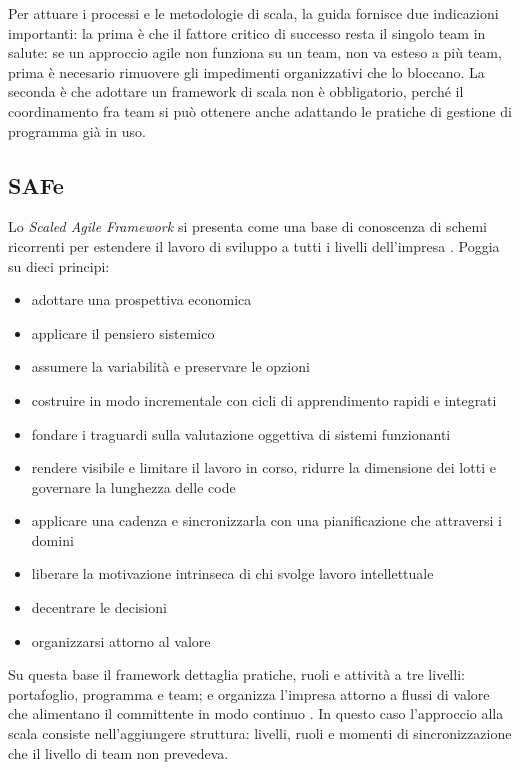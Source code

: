 Per attuare i processi e le metodologie di scala, la guida fornisce
due indicazioni importanti: la prima \`e che il fattore critico di successo resta il singolo team
in salute: se un approccio agile non funziona su un team, non va esteso a
pi\`u team, prima \`e necesario rimuovere gli impedimenti organizzativi che lo bloccano.
La seconda \`e che adottare un framework di scala non \`e obbligatorio, perch\'e
il coordinamento fra team si pu\`o ottenere anche adattando le pratiche di
gestione di programma gi\`a in uso.

\subsection{SAFe}

Lo \emph{Scaled Agile Framework} si presenta come una base di conoscenza di
schemi ricorrenti per estendere il lavoro di sviluppo a tutti i livelli
dell'impresa \cite{agilepracticeguide2}. Poggia su dieci principi:
\begin {itemize}
\item adottare una prospettiva economica
\item applicare il pensiero sistemico
\item assumere la variabilit\`a e preservare le opzioni
\item costruire in modo incrementale con cicli di apprendimento rapidi e
integrati
\item fondare i traguardi sulla valutazione oggettiva di sistemi funzionanti
\item rendere visibile e limitare il lavoro in corso, ridurre la dimensione dei
lotti e governare la lunghezza delle code
\item applicare una cadenza e sincronizzarla con una pianificazione che
attraversi i domini
\item liberare la motivazione intrinseca di chi svolge lavoro intellettuale
\item decentrare le decisioni
\item organizzarsi attorno al valore
\end {itemize}

Su questa base il framework dettaglia pratiche, ruoli e attivit\`a a tre
livelli: portafoglio, programma e team; e organizza l'impresa attorno a
flussi di valore che alimentano il committente in modo continuo
\cite{agilepracticeguide2}.
In questo caso l'approccio alla scala consiste
nell'aggiungere struttura: livelli, ruoli e momenti di sincronizzazione che il
livello di team non prevedeva.

